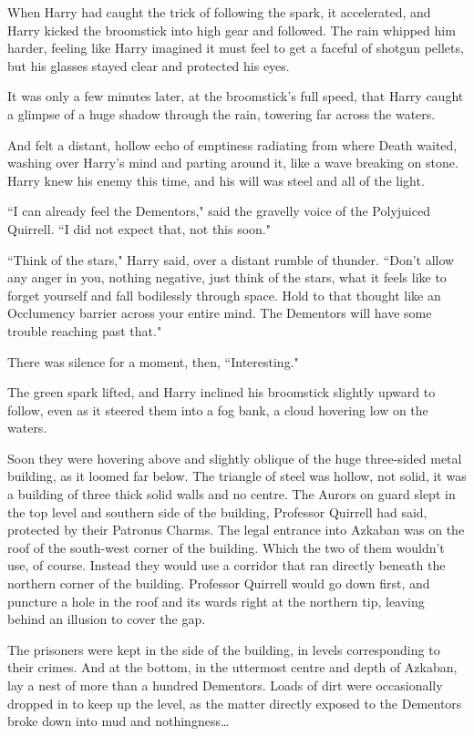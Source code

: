 When Harry had caught the trick of following the spark, it accelerated, and Harry kicked the broomstick into high gear and followed. The rain whipped him harder, feeling like Harry imagined it must feel to get a faceful of shotgun pellets, but his glasses stayed clear and protected his eyes.

It was only a few minutes later, at the broomstick's full speed, that Harry caught a glimpse of a huge shadow through the rain, towering far across the waters.

And felt a distant, hollow echo of emptiness radiating from where Death waited, washing over Harry's mind and parting around it, like a wave breaking on stone. Harry knew his enemy this time, and his will was steel and all of the light.

``I can already feel the Dementors," said the gravelly voice of the Polyjuiced Quirrell. ``I did not expect that, not this soon."

``Think of the stars," Harry said, over a distant rumble of thunder. ``Don't allow any anger in you, nothing negative, just think of the stars, what it feels like to forget yourself and fall bodilessly through space. Hold to that thought like an Occlumency barrier across your entire mind. The Dementors will have some trouble reaching past that."

There was silence for a moment, then, ``Interesting."

The green spark lifted, and Harry inclined his broomstick slightly upward to follow, even as it steered them into a fog bank, a cloud hovering low on the waters.

Soon they were hovering above and slightly oblique of the huge three-sided metal building, as it loomed far below. The triangle of steel was hollow, not solid, it was a building of three thick solid walls and no centre. The Aurors on guard slept in the top level and southern side of the building, Professor Quirrell had said, protected by their Patronus Charms. The legal entrance into Azkaban was on the roof of the south-west corner of the building. Which the two of them wouldn't use, of course. Instead they would use a corridor that ran directly beneath the northern corner of the building. Professor Quirrell would go down first, and puncture a hole in the roof and its wards right at the northern tip, leaving behind an illusion to cover the gap.

The prisoners were kept in the side of the building, in levels corresponding to their crimes. And at the bottom, in the uttermost centre and depth of Azkaban, lay a nest of more than a hundred Dementors. Loads of dirt were occasionally dropped in to keep up the level, as the matter directly exposed to the Dementors broke down into mud and nothingness{\ldots}

